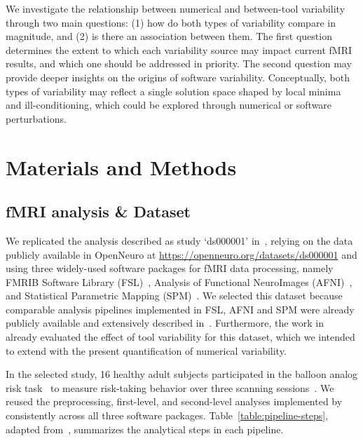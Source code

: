 \documentclass[11pt,onecolumn]{article}
\begin{document}
We investigate the relationship between numerical and between-tool
variability through two main questions: (1) how do both types of
variability compare in magnitude, and (2) is there an association between
them. The first question determines the extent to which each variability
source may impact current fMRI results, and which one should be addressed
in priority. The second question may provide deeper insights on the origins
of software variability. Conceptually, both types of variability may
reflect a single solution space shaped by local minima and
ill-conditioning, which could be explored through numerical or software
perturbations.


\section{Materials and Methods}

\subsection{fMRI analysis \& Dataset}

We replicated the analysis described as study `ds000001'
in~\cite{schonberg2012decreasing}, relying on the data publicly available
in OpenNeuro at \url{https://openneuro.org/datasets/ds000001} and using
three widely-used software packages for fMRI data processing, namely FMRIB
Software Library (FSL)~\cite{jenkinson2012fsl}, Analysis of Functional
NeuroImages (AFNI)~\cite{cox1996afni}, and Statistical Parametric
Mapping (SPM)~\cite{penny2011statistical}. We selected this dataset because
comparable analysis pipelines implemented in FSL, AFNI and SPM were already 
publicly available and extensively described in~\cite{bowring2019exploring}.
Furthermore, the work in~\cite{bowring2019exploring} already evaluated the
effect of tool variability for this dataset, which we intended to
extend with the present quantification of numerical variability.

In the selected study, 16 healthy adult subjects participated in the
balloon analog risk task~\cite{lejuez2002evaluation} to measure risk-taking
behavior over three scanning sessions~\cite{schonberg2012decreasing}. We
reused the preprocessing, first-level, and second-level analyses
implemented by~\cite{bowring2019exploring} consistently across all three
software packages. Table~\ref{table:pipeline-steps}, adapted from~\cite{bowring2019exploring},
summarizes the analytical steps in each
pipeline.
\end{document}
